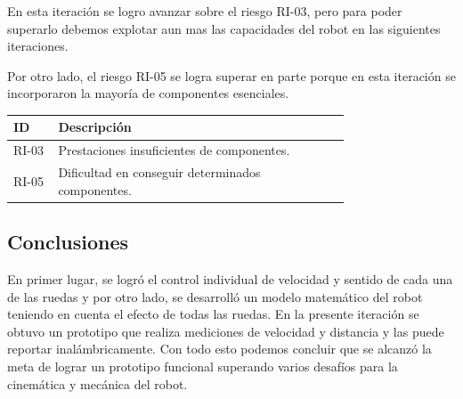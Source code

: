 En esta iteración se logro avanzar sobre el riesgo RI-03, pero para poder superarlo debemos explotar aun mas las capacidades del robot en las siguientes iteraciones.

Por otro lado, el riesgo RI-05 se logra superar en parte porque en esta iteración se incorporaron la mayoría de componentes esenciales.

\begin{center} \begin{tabular}{|p{0.10\linewidth}|p{0.65\linewidth}|}
\hline \rowcolor{test_header_color}
    ID & Descripción \\ 
\hline
    RI-03 & Prestaciones insuficientes de componentes. \\
\hline
    RI-05 & Dificultad en conseguir determinados componentes. \\
\hline
\end{tabular} \end{center}

\subsection{Conclusiones}

En primer lugar, se logró el control individual de velocidad y sentido de cada una de las ruedas y por otro lado, se desarrolló un modelo matemático del robot teniendo en cuenta el efecto de todas las ruedas.
En la presente iteración se obtuvo un prototipo que realiza mediciones de velocidad y distancia y las puede reportar inalámbricamente. Con todo esto podemos concluir que se alcanzó la meta de lograr un prototipo funcional superando varios desafíos para la cinemática y mecánica del robot.